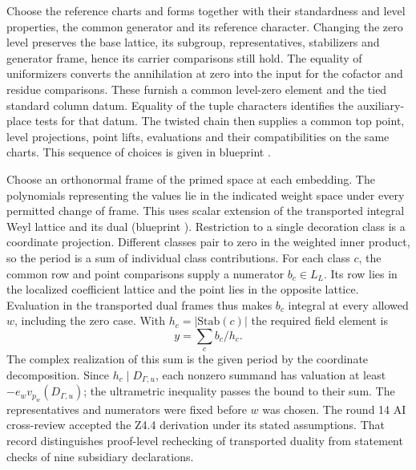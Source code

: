\begin{outline}
Choose the reference charts and forms together with their standardness and level properties, the common generator and its reference character. Changing the zero level preserves the base lattice, its subgroup, representatives, stabilizers and generator frame, hence its carrier comparisons still hold. The equality of uniformizers converts the annihilation at zero into the input for the cofactor and residue comparisons. These furnish a common level-zero element and the tied standard column datum. Equality of the tuple characters identifies the auxiliary-place tests for that datum. The twisted chain then supplies a common top point, level projections, point lifts, evaluations and their compatibilities on the same charts. This sequence of choices is given in blueprint .

Choose an orthonormal frame of the primed space at each embedding. The polynomials representing the values lie in the indicated weight space under every permitted change of frame. This uses scalar extension of the transported integral Weyl lattice and its dual (blueprint ). Restriction to a single decoration class is a coordinate projection. Different classes pair to zero in the weighted inner product, so the period is a sum of individual class contributions. For each class \(c\), the common row and point comparisons supply a numerator \(b_c\in L_L\). Its row lies in the localized coefficient lattice and the point lies in the opposite lattice. Evaluation in the transported dual frames thus makes \(b_c\) integral at every allowed \(w\), including the zero case. With \(h_c=|\mathrm{Stab}(c)|\) the required field element is
\[
                 y=\sum_c b_c/h_c.
\]
The complex realization of this sum is the given period by the coordinate decomposition. Since \(h_c\mid D_{\Gamma,u}\), each nonzero summand has valuation at least \(-e_wv_{p_w}(D_{\Gamma,u})\); the ultrametric inequality passes the bound to their sum. The representatives and numerators were fixed before \(w\) was chosen. The round 14 AI cross-review accepted the Z4.4 derivation under its stated assumptions. That record distinguishes proof-level rechecking of transported duality from statement checks of nine subsidiary declarations.
\end{outline}
